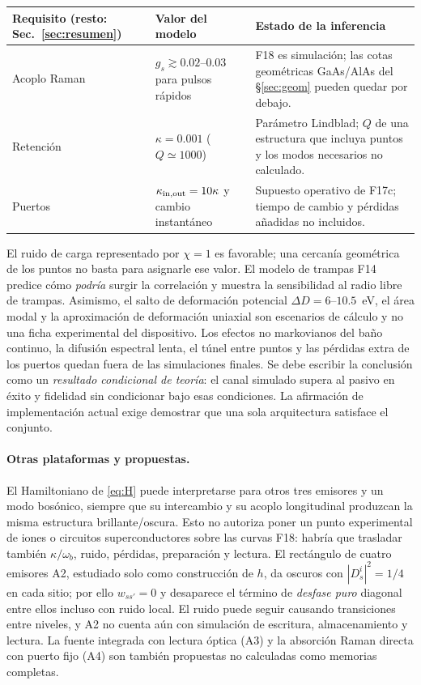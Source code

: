 \documentclass[11pt,a4paper]{article}
\newcommand{\wb}{\omega_b}
\begin{document}
\begin{center}\small
\begin{tabular}{p{3.2cm}p{4.2cm}p{6.0cm}}\toprule
Requisito (resto: Sec.~\ref{sec:resumen}) & Valor del modelo & Estado de la inferencia\\\midrule
Acoplo Raman & $g_s\gtrsim0.02$--$0.03$ para pulsos rápidos & F18 es simulación; las cotas geométricas GaAs/AlAs del \S\ref{sec:geom} pueden quedar por debajo.\\
Retención & $\kappa=0.001$ ($Q\simeq1000$) & Parámetro Lindblad; $Q$ de una estructura que incluya puntos y los modos necesarios no calculado.\\
Puertos & $\kappa_{\rm in,out}=10\kappa$ y cambio instantáneo & Supuesto operativo de F17c; tiempo de cambio y pérdidas añadidas no incluidos.\\
\end{tabular}
\end{center}

El ruido de carga representado por $\chi=1$ es favorable; una cercanía
geométrica de los puntos no basta para asignarle ese valor. El modelo de
trampas F14 predice cómo \emph{podría} surgir la correlación y muestra
la sensibilidad al radio libre de trampas. Asimismo, el salto de
deformación potencial $\Delta D=6$--$10.5$~eV, el área modal y la
aproximación de deformación uniaxial son escenarios de cálculo y no una
ficha experimental del dispositivo. Los efectos no markovianos del baño
continuo, la difusión espectral lenta, el túnel entre puntos y las
pérdidas extra de los puertos quedan fuera de las simulaciones finales.
Se debe escribir la conclusión como un \emph{resultado condicional de
teoría}: el canal simulado supera al pasivo en éxito y fidelidad sin
condicionar bajo esas condiciones. La afirmación de implementación
actual exige demostrar que una sola arquitectura satisface el conjunto.

\paragraph{Otras plataformas y propuestas.} El Hamiltoniano de
\eqref{eq:H} puede interpretarse para otros tres emisores y un modo
bosónico, siempre que su intercambio y su acoplo longitudinal produzcan
la misma estructura brillante/oscura. Esto no autoriza poner un punto
experimental de iones o circuitos superconductores sobre las curvas
F18: habría que trasladar también $\kappa/\wb$, ruido, pérdidas,
preparación y lectura. El rectángulo de cuatro emisores A2, estudiado
solo como construcción de $h$, da oscuros con $|D_s^i|^2=1/4$ en
cada sitio; por ello $w_{ss'}=0$ y desaparece el término de \emph{desfase
puro} diagonal entre ellos incluso con ruido local. El ruido puede
seguir causando transiciones entre niveles, y A2 no cuenta aún con
simulación de escritura, almacenamiento y lectura. La fuente integrada
con lectura óptica (A3) y la absorción Raman directa con puerto fijo
(A4) son también propuestas no calculadas como memorias completas.
\end{document}
